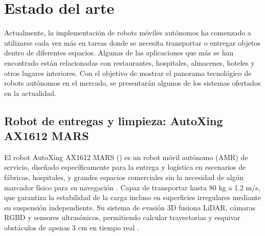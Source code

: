 %
%

\chapter{Estado del arte}
\label{cap:proto-estado-del-arte}

Actualmente, la implementación de robots móviles autónomos ha comenzado a utilizarse cada vez más en tareas donde se necesita transportar o entregar objetos dentro de diferentes espacios. Algunas de las aplicaciones que más se han encontrado están relacionadas con restaurantes, hospitales, almacenes, hoteles y otros lugares interiores. Con el objetivo de mostrar el panorama tecnológico de robots autónomos en el mercado, se presentarán algunos de los sistemas ofertados en la actualidad.

\section{Robot de entregas y limpieza: AutoXing AX1612 MARS}
\label{sec:EDA_1}

El robot AutoXing AX1612 MARS () es un robot móvil autónomo (AMR) de servicio, diseñado específicamente para la entrega y logística en escenarios de fábricas, hospitales, y grandes espacios comerciales sin la necesidad de algún marcador físico para su navegación \cite{EDA1}. Capaz de transportar hasta 80 kg a 1.2 m/s, que garantiza la estabilidad de la carga incluso en superficies irregulares mediante su suspensión independiente. Su sistema de evasión 3D fusiona LiDAR, cámaras RGBD y sensores ultrasónicos, permitiendo calcular trayectorias y esquivar obstáculos de apenas 3 cm en tiempo real \cite{EDA2}.

